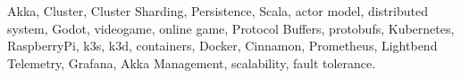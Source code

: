 \noindent Akka, Cluster, Cluster Sharding, Persistence, Scala, actor model, distributed system, Godot, videogame, online game, Protocol Buffers, protobufs,
Kubernetes, RaspberryPi, k3s, k3d, containers, Docker, Cinnamon, Prometheus, Lightbend Telemetry, Grafana, Akka Management, scalability, fault tolerance.
